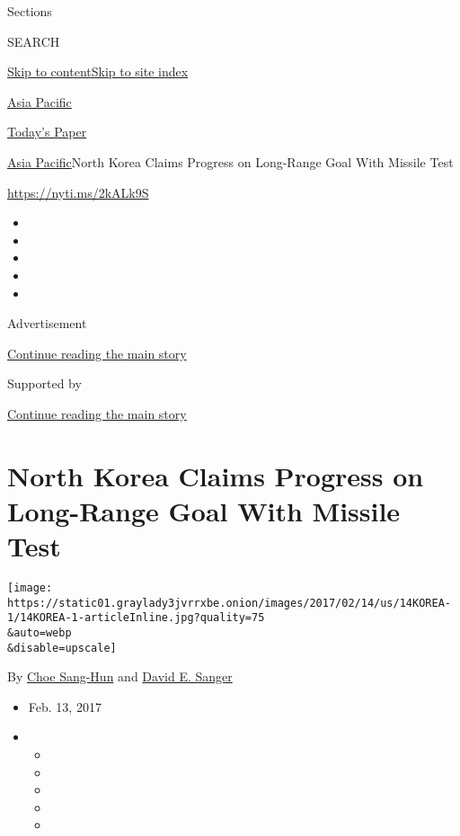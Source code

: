 Sections

SEARCH

\protect\hyperlink{site-content}{Skip to
content}\protect\hyperlink{site-index}{Skip to site index}

\href{https://www.nytimes3xbfgragh.onion/section/world/asia}{Asia
Pacific}

\href{https://myaccount.nytimes3xbfgragh.onion/auth/login?response_type=cookie\&client_id=vi}{}

\href{https://www.nytimes3xbfgragh.onion/section/todayspaper}{Today's
Paper}

\href{/section/world/asia}{Asia Pacific}\textbar{}North Korea Claims
Progress on Long-Range Goal With Missile Test

\url{https://nyti.ms/2kALk9S}

\begin{itemize}
\item
\item
\item
\item
\item
\end{itemize}

Advertisement

\protect\hyperlink{after-top}{Continue reading the main story}

Supported by

\protect\hyperlink{after-sponsor}{Continue reading the main story}

\hypertarget{north-korea-claims-progress-on-long-range-goal-with-missile-test}{%
\section{North Korea Claims Progress on Long-Range Goal With Missile
Test}\label{north-korea-claims-progress-on-long-range-goal-with-missile-test}}

\texttt{[image: https://static01.graylady3jvrrxbe.onion/images/2017/02/14/us/14KOREA-1/14KOREA-1-articleInline.jpg?quality=75\\\&auto=webp\\\&disable=upscale]}

By \href{http://www.nytimes3xbfgragh.onion/by/choe-sang-hun}{Choe
Sang-Hun} and
\href{http://www.nytimes3xbfgragh.onion/by/david-e-sanger}{David E.
Sanger}

\begin{itemize}
\item
  Feb. 13, 2017
\item
  \begin{itemize}
  \item
  \item
  \item
  \item
  \item
  \end{itemize}
\end{itemize}

